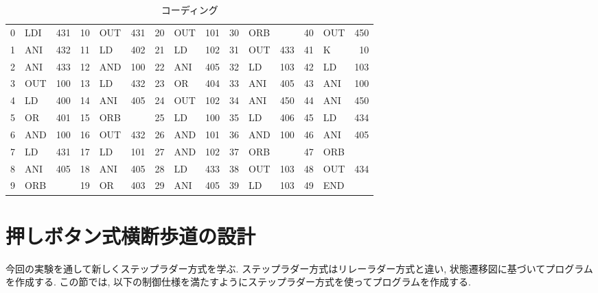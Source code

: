 \documentclass[titlepage]{jsarticle}
\begin{document}
    \begin{table}[h]
      \caption{コーディング}
      \label{tab:quiz_code}
      \centering
      \begin{tabular}{r|lr||r|lr||r|lr||r|lr||r|lr}
        0 & LDI & 431 & 10 & OUT & 431 & 20 & OUT & 101 & 30 & ORB & &     40 & OUT & 450 \\
        1 & ANI & 432 & 11 & LD &  402 & 21 & LD &  102 & 31 & OUT & 433 & 41 & K &   10 \\
        2 & ANI & 433 & 12 & AND & 100 & 22 & ANI & 405 & 32 & LD &  103 & 42 & LD &  103 \\
        3 & OUT & 100 & 13 & LD &  432 & 23 & OR &  404 & 33 & ANI & 405 & 43 & ANI & 100 \\
        4 & LD &  400 & 14 & ANI & 405 & 24 & OUT & 102 & 34 & ANI & 450 & 44 & ANI & 450 \\
        5 & OR &  401 & 15 & ORB & &     25 & LD &  100 & 35 & LD &  406 & 45 & LD &  434 \\
        6 & AND & 100 & 16 & OUT & 432 & 26 & AND & 101 & 36 & AND & 100 & 46 & ANI & 405 \\
        7 & LD &  431 & 17 & LD &  101 & 27 & AND & 102 & 37 & ORB & &     47 & ORB & \\
        8 & ANI & 405 & 18 & ANI & 405 & 28 & LD &  433 & 38 & OUT & 103 & 48 & OUT & 434 \\
        9 & ORB & &     19 & OR &  403 & 29 & ANI & 405 & 39 & LD &  103 & 49 & END & \\
      \end{tabular}
    \end{table}
\section{押しボタン式横断歩道の設計}
  今回の実験を通して新しくステップラダー方式を学ぶ.
  ステップラダー方式はリレーラダー方式と違い,
  状態遷移図に基づいてプログラムを作成する.
  この節では, 以下の制御仕様を満たすようにステップラダー方式を使ってプログラムを作成する.
\end{document}
